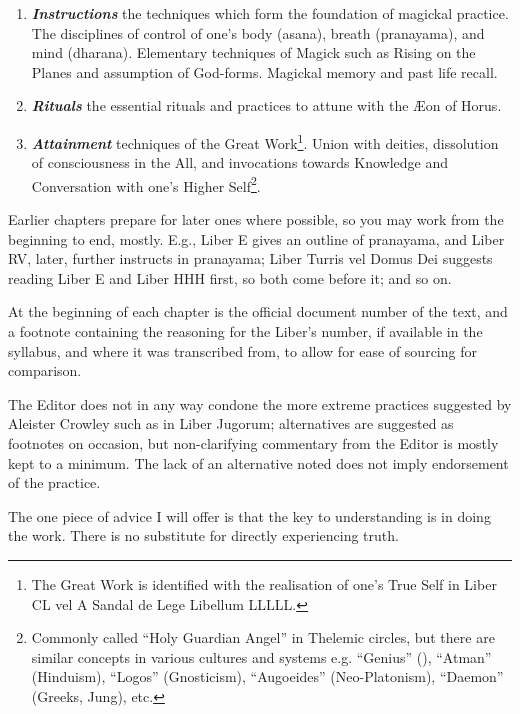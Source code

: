 \begin{enumerate}[label=\greek*]
\item \textbf{\textit{Instructions}} \textemdash{} the techniques which form the foundation of magickal practice. The disciplines of control of one's body (asana), breath (pranayama), and mind (dharana). Elementary techniques of Magick such as Rising on the Planes and assumption of God-forms. Magickal memory and past life recall.
\item \textbf{\textit{Rituals}} \textemdash{} the essential rituals and practices to attune with the \AE{}on of Horus.
\item \textbf{\textit{Attainment}} \textemdash{} techniques of the Great Work\footnote{The Great Work is identified with the realisation of one's True Self in Liber CL vel  A Sandal de Lege Libellum L\textendash{}L\textendash{}L\textendash{}L\textendash{}L.}. Union with deities, dissolution of consciousness in the All, and invocations towards Knowledge and Conversation with one's Higher Self\footnote{Commonly called \enquote{Holy Guardian Angel} in Thelemic circles, but there are similar concepts in various cultures and systems e.g. \enquote{Genius} (\GD{}), \enquote{Atman} (Hinduism), \enquote{Logos} (Gnosticism), \enquote{Augoeides} (Neo-Platonism), \enquote{Daemon} (Greeks, Jung), etc.}.
\end{enumerate}

Earlier chapters prepare for later ones where possible, so you may work from the beginning to end, mostly. E.g., Liber E gives an outline of pranayama, and Liber RV, later, further instructs in pranayama; Liber Turris vel Domus Dei suggests reading Liber E and Liber HHH first, so both come before it; and so on.

At the beginning of each chapter is the official document number of the text, and a footnote containing the reasoning for the Liber's number, if available in the syllabus, and where it was transcribed from, to allow for ease of sourcing for comparison.

The Editor does not in any way condone the more extreme practices suggested by Aleister Crowley such as in Liber Jugorum; alternatives are suggested as footnotes on occasion, but non-clarifying commentary from the Editor is mostly kept to a minimum. The lack of an alternative noted does not imply endorsement of the practice.

The one piece of advice I will offer is that the key to understanding is in doing the work. There is no substitute for directly experiencing truth.

